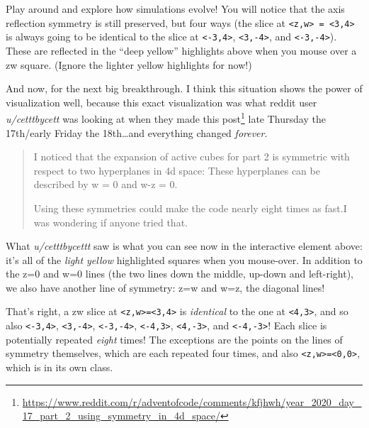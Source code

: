 \documentclass[]{article}
\renewcommand{\href}[2]{#2\footnote{\url{#1}}}
\begin{document}
Play around and explore how simulations evolve! You will notice that the axis
reflection symmetry is still preserved, but four ways (the slice at
\texttt{\textless{}z,w\textgreater{}\ =\ \textless{}3,4\textgreater{}} is always
going to be identical to the slice at \texttt{\textless{}-3,4\textgreater{}},
\texttt{\textless{}3,-4\textgreater{}}, and
\texttt{\textless{}-3,-4\textgreater{}}). These are reflected in the ``deep
yellow'' highlights above when you mouse over a zw square. (Ignore the lighter
yellow highlights for now!)

And now, for the next big breakthrough. I think this situation shows the power
of visualization well, because this exact visualization was what reddit user
\emph{u/cetttbycett} was looking at when
\href{https://www.reddit.com/r/adventofcode/comments/kfjhwh/year_2020_day_17_part_2_using_symmetry_in_4d_space/}{they
made this post} late Thursday the 17th/early Friday the 18th\ldots and
everything changed \emph{forever}.

\begin{quote}
I noticed that the expansion of active cubes for part 2 is symmetric with
respect to two hyperplanes in 4d space: These hyperplanes can be described by w
= 0 and w-z = 0.

Using these symmetries could make the code nearly eight times as fast.I was
wondering if anyone tried that.
\end{quote}

What \emph{u/cetttbycettt} saw is what you can see now in the interactive
element above: it's all of the \emph{light yellow} highlighted squares when you
mouse-over. In addition to the z=0 and w=0 lines (the two lines down the middle,
up-down and left-right), we also have another line of symmetry: z=w and w=z, the
diagonal lines!

That's right, a zw slice at
\texttt{\textless{}z,w\textgreater{}=\textless{}3,4\textgreater{}} is
\emph{identical} to the one at \texttt{\textless{}4,3\textgreater{}}, and so
also \texttt{\textless{}-3,4\textgreater{}},
\texttt{\textless{}3,-4\textgreater{}}, \texttt{\textless{}-3,-4\textgreater{}},
\texttt{\textless{}-4,3\textgreater{}}, \texttt{\textless{}4,-3\textgreater{}},
and \texttt{\textless{}-4,-3\textgreater{}}! Each slice is potentially repeated
\emph{eight} times! The exceptions are the points on the lines of symmetry
themselves, which are each repeated four times, and also
\texttt{\textless{}z,w\textgreater{}=\textless{}0,0\textgreater{}}, which is in
its own class.
\end{document}
